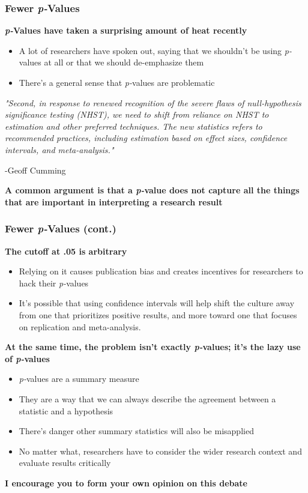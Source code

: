 \documentclass[10pt, block=fill]{beamer}
\begin{document}
\begin{frame}
    \frametitle{Fewer \textit{p-}Values}
    
    \textbf{\textit{p-}Values have taken a surprising amount of heat recently}
    \begin{itemize}
        \item A lot of researchers have spoken out, saying that we shouldn't be using \textit{p-}values at all or that we should de-emphasize them
        \item There's a general sense that \textit{p-}values are problematic
    \end{itemize}
    
    {\small \textit{"Second, in response to renewed recognition of the severe flaws of null-hypothesis significance testing (NHST), we need to shift from reliance on NHST to estimation and other preferred techniques. The new statistics refers to recommended practices, including estimation based on effect sizes, confidence intervals, and meta-analysis."}}
    \begin{flushright}
        -Geoff Cumming
    \end{flushright}     
    
    \textbf{A common argument is that a \textit{p-}value does not capture all the things that are important in interpreting a research result }
\end{frame}

\begin{frame}
    \frametitle{Fewer \textit{p-}Values (cont.)}

    \textbf{The cutoff at .05 is arbitrary}
    \begin{itemize}
        \item Relying on it causes publication bias and creates incentives for researchers to hack their \textit{p-}values
        \item It's possible that using confidence intervals will help shift the culture away from one that prioritizes positive results, and more toward one that focuses on replication and meta-analysis.
    \end{itemize}
    
    \textbf{At the same time, the problem isn't exactly \textit{p-}values; it's the lazy use of \textit{p-}values}
    \begin{itemize}
        \item \textit{p-}values are a summary measure
        \item They are a way that we can always describe the agreement between a statistic and a hypothesis
        \item There's danger other summary statistics will also be misapplied
        \item No matter what, researchers have to consider the wider research context and evaluate results critically
    \end{itemize}
    
    \textbf{I encourage you to form your own opinion on this debate}
    
\end{frame}
\end{document}
